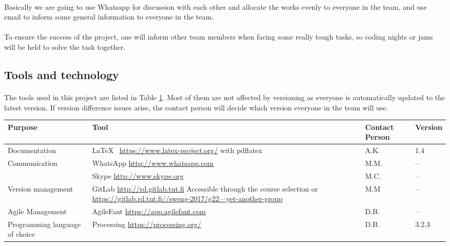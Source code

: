 \paragraph{} Basically we are going to use Whatsapp for discussion with each other and allocate the works evenly to everyone in the team, and use email to inform some general information to everyone in the team.

\paragraph{} To ensure the success of the project, one will inform other team members when facing some really tough tasks, so coding nights or jams will be held to solve the task together.

\subsection{Tools and technology}

\paragraph{} The tools used in this project are listed in Table \ref{table:tools}. Most of them are not affected by versioning as everyone is automatically updated to the latest version. If version difference issues arise, the contact person will decide which version everyone in the team will use.

\begin{table}[h]
\scriptsize
{}
\label{table:tools}
\begin{tabularx}{\textwidth}{|l|X|l|l|}
\hline
\rowcolor{Gray} \textbf{Purpose} & \textbf{Tool} & \textbf{Contact Person} & \textbf{Version} \\
\hline
Documentation & \LaTeX~ \href{https://www.latex-project.org/}{https://www.latex-project.org/} with pdflatex & A.K. & 1.4 \\
\hline
\multirow{2}{*}{Communication } & WhatsApp \href{http://www.whatsapp.com}{http://www.whatsapp.com} & M.M. & – \\
                                \cline{2-4}
                                & Skype \href{http://www.skype.org}{http://www.skype.org} & M.C. & – \\
\hline
Version management & GitLab \href{http://rd.gitlab.tut.fi}{http://rd.gitlab.tut.fi} \newline Accessible through the course selection or \href{https://gitlab.rd.tut.fi//sweng-2017/g22---yet-another-group}{https://gitlab.rd.tut.fi//sweng-2017/g22---yet-another-group} & M.M & – \\
\hline
Agile Management & AgileFant \href{https://app.agilefant.com}{https://app.agilefant.com} & D.B. & – \\
\hline
Programming language of choice & Processing \href{https://processing.org/}{https://processing.org/} & D.B. & 3.2.3 \\
\hline
\end{tabularx}
\end{table}
